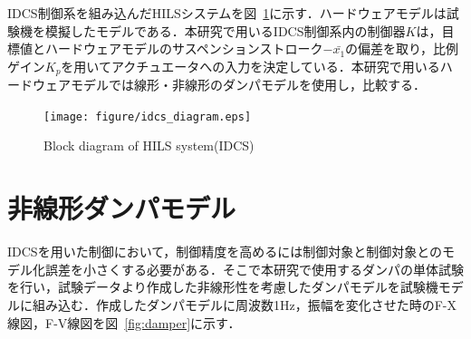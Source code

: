 \documentclass{article_vdlab_sotsuron_youshi}
\begin{document}
IDCS制御系を組み込んだHILSシステムを図~\ref{fig:idcs_diagram}に示す．ハードウェアモデルは試験機を模擬したモデルである．本研究で用いるIDCS制御系内の制御器$K$は，目標値とハードウェアモデルのサスペンションストローク$-\bar{x_1}$の偏差を取り，比例ゲイン$K_p$を用いてアクチュエータへの入力を決定している．本研究で用いるハードウェアモデルでは線形・非線形のダンパモデルを使用し，比較する．

\vspace*{3mm}
\begin{figure}[htp]
  \begin{center}
    \texttt{[image: figure/idcs\_diagram.eps]}
    \vspace*{1mm}
    \caption{Block diagram of HILS system(IDCS)}
    \label{fig:idcs_diagram}
  \end{center}
\end{figure}

\section{非線形ダンパモデル}
IDCSを用いた制御において，制御精度を高めるには制御対象と制御対象とのモデル化誤差を小さくする必要がある．そこで本研究で使用するダンパの単体試験を行い，試験データより作成した非線形性を考慮したダンパモデルを試験機モデルに組み込む．作成したダンパモデルに周波数1Hz，振幅を変化させた時のF-X線図，F-V線図を図~\ref{fig:damper}に示す．
\end{document}
